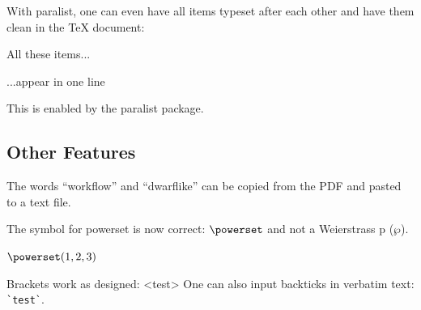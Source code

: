 With paralist, one can even have all items typeset after each other and have them clean in the TeX document:

\begin{ltgexample}
\begin{inparaenum}
  \item All these items...
  \item ...appear in one line
  \item This is enabled by the paralist package.
\end{inparaenum}
\end{ltgexample}

\subsection{Other Features}

\begin{ltgexample}
The words \enquote{workflow} and \enquote{dwarflike} can be copied from the PDF and pasted to a text file.
\end{ltgexample}

\begin{ltgexample}
The symbol for powerset is now correct: $\powerset$ and not a Weierstrass p ($\wp$).

$\powerset({1,2,3})$
\end{ltgexample}

\begin{ltgexample}
Brackets work as designed:
<test>
One can also input backticks in verbatim text: \verb|`test`|.
\end{ltgexample}
